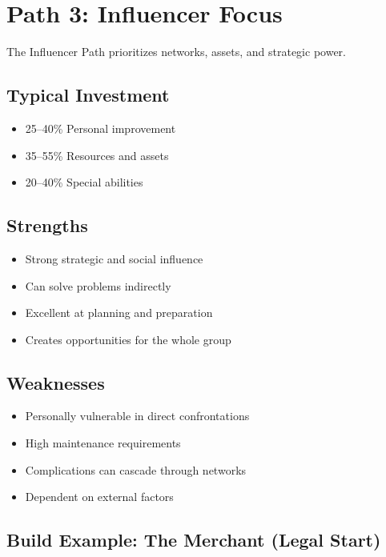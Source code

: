 \documentclass[11pt,twoside,openany]{book}
\begin{document}
\section*{Path 3: Influencer Focus} 

The Influencer Path prioritizes networks, assets, and strategic power.

\subsection*{Typical Investment}

\begin{itemize}
\item 25–40\% Personal improvement
\item 35–55\% Resources and assets
\item 20–40\% Special abilities
\end{itemize}

\subsection*{Strengths}

\begin{itemize}
\item Strong strategic and social influence
\item Can solve problems indirectly
\item Excellent at planning and preparation
\item Creates opportunities for the whole group
\end{itemize}

\subsection*{Weaknesses}

\begin{itemize}
\item Personally vulnerable in direct confrontations
\item High maintenance requirements
\item Complications can cascade through networks
\item Dependent on external factors
\end{itemize}

\subsection*{Build Example: The Merchant (Legal Start)}
\end{document}
